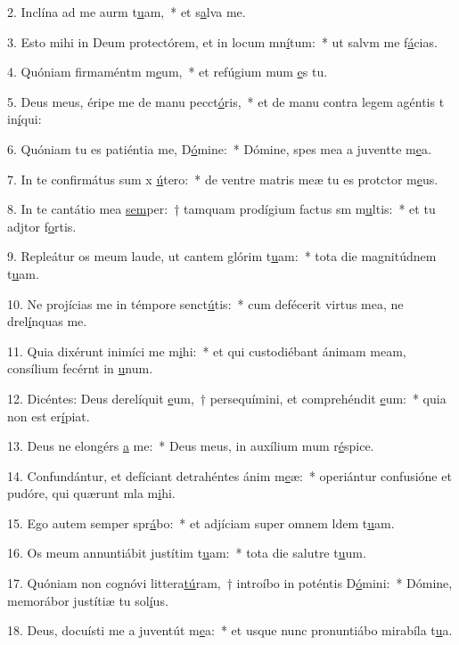 2. Inclína ad me aurm t\uline{u}am,~* et s\uline{a}lva me.\par 
3. Esto mihi in Deum protectórem, et in locum mn\uline{í}tum:~* ut salvm me f\uline{á}cias.\par 
4. Quóniam firmaméntm m\uline{e}um,~* et refúgium mum \uline{e}s tu.\par 
5. Deus meus, éripe me de manu pecct\uline{ó}ris,~* et de manu contra legem agéntis t in\uline{í}qui:\par 
6. Quóniam tu es patiéntia me, D\uline{ó}mine:~* Dómine, spes mea a juventte m\uline{e}a.\par 
7. In te confirmátus sum x \uline{ú}tero:~* de ventre matris meæ tu es protctor m\uline{e}us.\par 
8. In te cantátio mea \uline{sem}per:~† tamquam prodígium factus sm m\uline{u}ltis:~* et tu adjtor f\uline{o}rtis.\par 
9. Repleátur os meum laude, ut cantem glórim t\uline{u}am:~* tota die magnitúdnem t\uline{u}am.\par 
10. Ne projícias me in témpore senct\uline{ú}tis:~* cum defécerit virtus mea, ne drel\uline{í}nquas me.\par 
11. Quia dixérunt inimíci me m\uline{i}hi:~* et qui custodiébant ánimam meam, consílium fecérnt in \uline{u}num.\par 
12. Dicéntes: Deus derelíquit \uline{e}um,~† persequímini, et comprehéndit \uline{e}um:~* quia non est  er\uline{í}piat.\par 
13. Deus ne elongérs \uline{a} me:~* Deus meus, in auxílium mum r\uline{é}spice.\par 
14. Confundántur, et defíciant detrahéntes ánim m\uline{e}æ:~* operiántur confusióne et pudóre, qui quærunt mla m\uline{i}hi.\par 
15. Ego autem semper spr\uline{á}bo:~* et adjíciam super omnem ldem t\uline{u}am.\par 
16. Os meum annuntiábit justítim t\uline{u}am:~* tota die salutre t\uline{u}um.\par 
17. Quóniam non cognóvi littera\uline{tú}ram,~† introíbo in poténtis D\uline{ó}mini:~* Dómine, memorábor justítiæ tu sol\uline{í}us.\par 
18. Deus, docuísti me a juventút m\uline{e}a:~* et usque nunc pronuntiábo mirabíla t\uline{u}a.\par 
